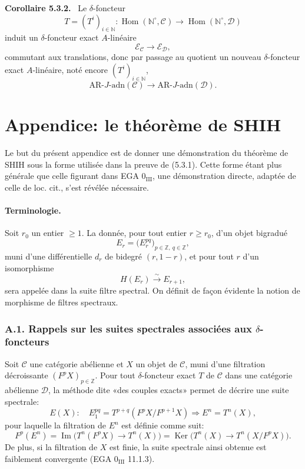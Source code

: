 \documentclass[11pt]{article}
\newenvironment{statement}[1]{\par\medskip\noindent\textbf{#1.}\ }{\par\medskip}
\DeclareMathOperator{\Hom}{Hom}
\providecommand{\Ker}{\operatorname{Ker}}
\providecommand{\Hom}{\operatorname{Hom}}
\providecommand{\Im}{\operatorname{Im}}
\providecommand{\Ker}{\operatorname{Ker}}
\renewcommand{\Im}{\operatorname{Im}}
\providecommand{\Ker}{\operatorname{Ker}}
\providecommand{\Im}{\operatorname{Im}}
\providecommand{\Hom}{\operatorname{Hom}}
\begin{document}
\begin{statement}{Corollaire 5.3.2}
Le \(\delta\)-foncteur
\[
T=(T^i)_{i\in\mathbb N}:\Hom(\mathbb N^\circ,\mathcal C)\longrightarrow\Hom(\mathbb N^\circ,\mathcal D)
\]
induit un \(\delta\)-foncteur exact \(A\)-linéaire
\[
\mathcal E_{\mathcal C}\longrightarrow\mathcal E_{\mathcal D},
\]
commutant aux translations, donc par passage au quotient un nouveau \(\delta\)-foncteur exact \(A\)-linéaire, noté encore \((T^i)_{i\in\mathbb N}\),
\[
\mathrm{AR}\text{-}J\text{-adn}(\mathcal C)\longrightarrow
\mathrm{AR}\text{-}J\text{-adn}(\mathcal D).
\]
\end{statement}

\section*{Appendice: le théorème de SHIH}

Le but du présent appendice est de donner une démonstration du théorème de SHIH sous la forme utilisée dans la preuve de (5.3.1). Cette forme étant plus générale que celle figurant dans EGA \(0_{\mathrm{III}}\), une démonstration directe, adaptée de celle de loc. cit., s'est révélée nécessaire.

\paragraph{Terminologie.}
Soit \(r_0\) un entier \(\ge1\). La donnée, pour tout entier \(r\ge r_0\), d'un objet bigradué
\[
E_r=\bigl(E_r^{pq}\bigr)_{p\in\mathbb Z,\ q\in\mathbb Z},
\]
muni d'une différentielle \(d_r\) de bidegré \((r,1-r)\), et pour tout \(r\) d'un isomorphisme
\[
H(E_r)\xrightarrow{\sim}E_{r+1},
\]
sera appelée dans la suite filtre spectral. On définit de façon évidente la notion de morphisme de filtres spectraux.

\subsubsection*{A.1. Rappels sur les suites spectrales associées aux \(\delta\)-foncteurs}

Soit \(\mathcal C\) une catégorie abélienne et \(X\) un objet de \(\mathcal C\), muni d'une filtration décroissante \((F^pX)_{p\in\mathbb Z}\). Pour tout \(\delta\)-foncteur exact \(T\) de \(\mathcal C\) dans une catégorie abélienne \(\mathcal D\), la méthode dite «des couples exacts» permet de décrire une suite spectrale:
\[
E(X):\quad E_1^{pq}=T^{p+q}(F^pX/F^{p+1}X)\Rightarrow E^n=T^n(X),
\]
pour laquelle la filtration de \(E^n\) est définie comme suit:
\[
F^p(E^n)=\Im\bigl(T^n(F^pX)\longrightarrow T^n(X)\bigr)
=\Ker\bigl(T^n(X)\longrightarrow T^n(X/F^pX)\bigr).
\]
De plus, si la filtration de \(X\) est finie, la suite spectrale ainsi obtenue est faiblement convergente (EGA \(0_{\mathrm{III}}\) 11.1.3).
\end{document}
